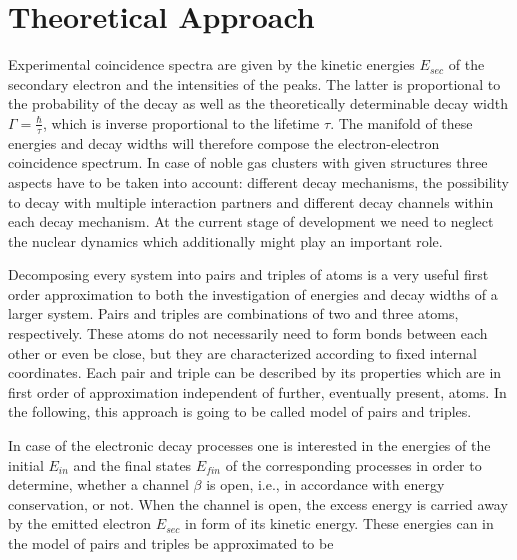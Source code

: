 \section{Theoretical Approach}
Experimental coincidence spectra are given by the kinetic energies $E_{sec}$
of the secondary electron
and the intensities of the peaks. The latter is proportional to the
probability of the decay as well as the theoretically determinable
decay width $\Gamma=\frac{\hbar}{\tau}$,
which is inverse proportional to the lifetime $\tau$. The manifold of these
energies and decay widths will therefore compose the electron-electron
coincidence spectrum.
In case of noble gas clusters
with given structures three aspects have to be taken into account:
different decay mechanisms, the possibility to decay with multiple
interaction partners and different decay channels within each decay mechanism.
At the current stage of development we need to neglect the nuclear dynamics which
additionally might play an important role.

Decomposing every system into pairs and triples of atoms is a very useful
first order approximation to both the investigation of energies and
decay widths of a larger system. Pairs and triples are combinations of
two and three atoms, respectively.
These atoms do not necessarily need to form bonds between each other or
even be close, but they are characterized according to fixed internal
coordinates. Each pair and triple can be described by its properties
which are in first order of approximation independent of further, eventually
present, atoms. In the following, this approach is going to be called
model of pairs and triples.

In case of the electronic decay processes one is interested in the
energies of the initial $E_{in}$ and the final states $E_{fin}$ of
the corresponding processes in order to determine, whether a channel $\beta$
is open, i.e., in accordance with energy conservation, or not. When the channel
is open, the excess energy is carried away by the emitted electron $E_{sec}$
in form of its kinetic energy. These energies can in the model
of pairs and triples be approximated to be

